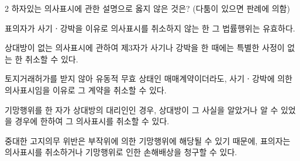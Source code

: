\begin{question}{2}
하자있는 의사표시에 관한 설명으로 옳지 않은 것은? (다툼이 있으면 판례에 의함)
\begin{choices}
  \item 표의자가 사기ㆍ강박을 이유로 의사표시를 취소하지 않는 한 그 법률행위는 유효하다.
  \item 상대방이 없는 의사표시에 관하여 제3자가 사기나 강박을 한 때에는 특별한 사정이 없는 한 취소할 수 있다.
  \item 토지거래허가를 받지 않아 유동적 무효 상태인 매매계약이더라도, 사기ㆍ강박에 의한 의사표시임을 이유로 그 계약을 취소할 수 있다.
  \item 기망행위를 한 자가 상대방의 대리인인 경우, 상대방이 그 사실을 알았거나 알 수 있었을 경우에 한하여 그 의사표시를 취소할 수 있다.
  \item 중대한 고지의무 위반은 부작위에 의한 기망행위에 해당될 수 있기 때문에, 표의자는 의사표시를 취소하거나 기망행위로 인한 손해배상을 청구할 수 있다.
\end{choices}
\end{question}
